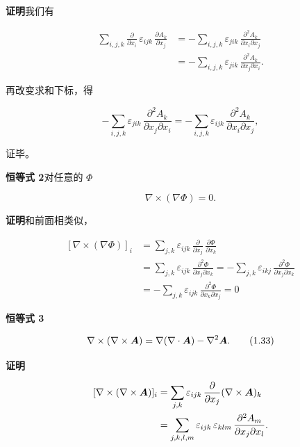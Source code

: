 \textbf{证明}\quad 我们有

\begin{equation*}
\begin{aligned}
\sum_{i,j,k} \frac{\partial}{\partial x_i}\, \varepsilon_{ijk}\, \frac{\partial A_k}{\partial x_j}
&= -\sum_{i,j,k} \varepsilon_{jik}\, \frac{\partial^{2} A_k}{\partial x_i \partial x_j}\\
&= -\sum_{i,j,k} \varepsilon_{jik}\, \frac{\partial^{2} A_k}{\partial x_j \partial x_i}.
\end{aligned}
\end{equation*}

再改变求和下标，得

\begin{equation*}
-\sum_{i,j,k} \varepsilon_{jik}\, \frac{\partial^{2} A_k}{\partial x_j \partial x_i}
= -\sum_{i,j,k} \varepsilon_{ijk}\, \frac{\partial^{2} A_k}{\partial x_i \partial x_j},
\end{equation*}

证毕。

\textbf{恒等式 2}\quad 对任意的 $\Phi$

\begin{equation}
\nabla \times (\nabla\Phi) = 0.
\tag{1.32}
\end{equation}

\textbf{证明}\quad 和前面相类似，

\begin{equation*}
\begin{aligned}
[\nabla \times (\nabla\Phi)]_i &= \sum_{j,k} \varepsilon_{ijk}\, \frac{\partial}{\partial x_j}\, \frac{\partial\Phi}{\partial x_k}\\
&= \sum_{j,k} \varepsilon_{ijk}\, \frac{\partial^{2}\Phi}{\partial x_j \partial x_k}
 = -\sum_{j,k} \varepsilon_{ikj}\, \frac{\partial^{2}\Phi}{\partial x_j \partial x_k}\\
&= -\sum_{j,k} \varepsilon_{ijk}\, \frac{\partial^{2}\Phi}{\partial x_k \partial x_j} = 0
\end{aligned}
\end{equation*}

\textbf{恒等式 3}\quad

\begin{equation}
\nabla \times (\nabla \times \bm{A}) = \nabla(\nabla \cdot \bm{A}) - \nabla^{2}\bm{A}.
\tag{1.33}
\end{equation}

\textbf{证明}\quad

\begin{equation*}
\begin{aligned}
[\nabla \times (\nabla \times \ve{A})]_i &= \sum_{j,k} \varepsilon_{ijk}\, \frac{\partial}{\partial x_j} (\nabla \times \ve{A})_k\\
&= \sum_{j,k,l,m} \varepsilon_{ijk}\, \varepsilon_{klm}\, \frac{\partial^{2} A_m}{\partial x_j \partial x_l}.
\end{aligned}
\end{equation*}

